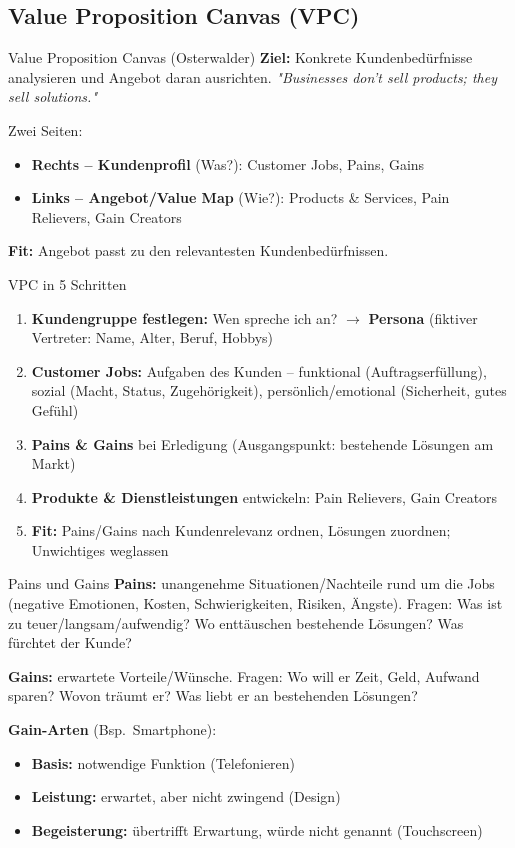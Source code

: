 \documentclass[a4paper, fontsize=7pt]{scrartcl}
\begin{document}
\subsection{Value Proposition Canvas (VPC)}

\begin{mainbox}{Value Proposition Canvas (Osterwalder)}
\textbf{Ziel:} Konkrete Kundenbedürfnisse analysieren und Angebot daran
ausrichten. \emph{"Businesses don't sell products; they sell solutions."}

Zwei Seiten:
\begin{itemize}
    \item \textbf{Rechts -- Kundenprofil} (Was?): Customer Jobs, Pains, Gains
    \item \textbf{Links -- Angebot/Value Map} (Wie?): Products \& Services,
    Pain Relievers, Gain Creators
\end{itemize}
\textbf{Fit:} Angebot passt zu den relevantesten Kundenbedürfnissen.
\end{mainbox}

\begin{mainbox}{VPC in 5 Schritten}
\begin{enumerate}
    \item \textbf{Kundengruppe festlegen:} Wen spreche ich an? $\to$
    \textbf{Persona} (fiktiver Vertreter: Name, Alter, Beruf, Hobbys)
    \item \textbf{Customer Jobs:} Aufgaben des Kunden -- funktional
    (Auftragserfüllung), sozial (Macht, Status, Zugehörigkeit),
    persönlich/emotional (Sicherheit, gutes Gefühl)
    \item \textbf{Pains \& Gains} bei Erledigung (Ausgangspunkt: bestehende
    Lösungen am Markt)
    \item \textbf{Produkte \& Dienstleistungen} entwickeln: Pain Relievers,
    Gain Creators
    \item \textbf{Fit:} Pains/Gains nach Kundenrelevanz ordnen, Lösungen
    zuordnen; Unwichtiges weglassen
\end{enumerate}
\end{mainbox}

\begin{mainbox}{Pains und Gains}
\textbf{Pains:} unangenehme Situationen/Nachteile rund um die Jobs (negative
Emotionen, Kosten, Schwierigkeiten, Risiken, Ängste). Fragen: Was ist zu
teuer/langsam/aufwendig? Wo enttäuschen bestehende Lösungen? Was fürchtet der
Kunde?

\textbf{Gains:} erwartete Vorteile/Wünsche. Fragen: Wo will er Zeit, Geld,
Aufwand sparen? Wovon träumt er? Was liebt er an bestehenden Lösungen?

\textbf{Gain-Arten} (Bsp.\ Smartphone):
\begin{itemize}
    \item \textbf{Basis:} notwendige Funktion (Telefonieren)
    \item \textbf{Leistung:} erwartet, aber nicht zwingend (Design)
    \item \textbf{Begeisterung:} übertrifft Erwartung, würde nicht genannt
    (Touchscreen)
\end{itemize}
\end{mainbox}
\end{document}
